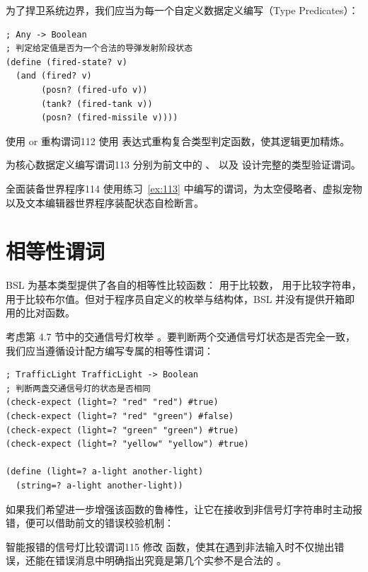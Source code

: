 为了捍卫系统边界，我们应当为每一个自定义数据定义编写（Type Predicates）：

\begin{lstlisting}[language=BSL]
; Any -> Boolean
; 判定给定值是否为一个合法的导弹发射阶段状态
(define (fired-state? v)
  (and (fired? v)
       (posn? (fired-ufo v))
       (tank? (fired-tank v))
       (posn? (fired-missile v))))
\end{lstlisting}

\begin{exercise}{使用 or 重构谓词}{112}
使用  表达式重构复合类型判定函数，使其逻辑更加精炼。
\end{exercise}

\begin{exercise}{为核心数据定义编写谓词}{113}
分别为前文中的 、 以及  设计完整的类型验证谓词。
\end{exercise}

\begin{exercise}{全面装备世界程序}{114}
使用练习~\ref{ex:113} 中编写的谓词，为太空侵略者、虚拟宠物以及文本编辑器世界程序装配状态自检断言。
\end{exercise}

\section{相等性谓词}
\label{sec:6.5_equality_predicates}

BSL 为基本类型提供了各自的相等性比较函数：\code{=} 用于比较数， 用于比较字符串， 用于比较布尔值。但对于程序员自定义的枚举与结构体，BSL 并没有提供开箱即用的比对函数。

考虑第 4.7 节中的交通信号灯枚举 。要判断两个交通信号灯状态是否完全一致，我们应当遵循设计配方编写专属的相等性谓词：

\begin{lstlisting}[language=BSL]
; TrafficLight TrafficLight -> Boolean
; 判断两盏交通信号灯的状态是否相同
(check-expect (light=? "red" "red") #true)
(check-expect (light=? "red" "green") #false)
(check-expect (light=? "green" "green") #true)
(check-expect (light=? "yellow" "yellow") #true)

(define (light=? a-light another-light)
  (string=? a-light another-light))
\end{lstlisting}

如果我们希望进一步增强该函数的鲁棒性，让它在接收到非信号灯字符串时主动报错，便可以借助前文的错误校验机制：

\begin{exercise}{智能报错的信号灯比较谓词}{115}
修改  函数，使其在遇到非法输入时不仅抛出错误，还能在错误消息中明确指出究竟是第几个实参不是合法的 。
\end{exercise}

